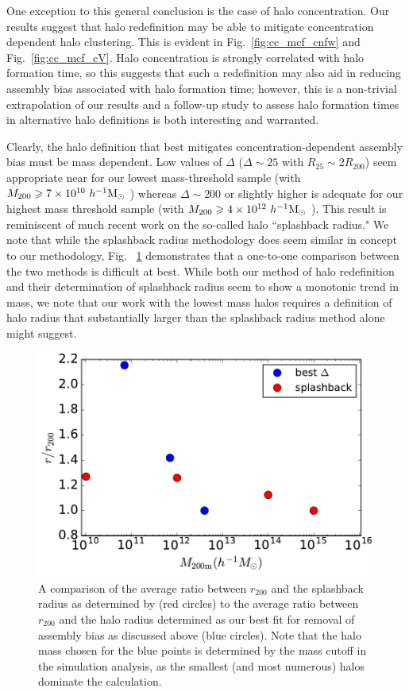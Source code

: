 \documentclass[usenatbib]{mnras}
\begin{document}
One exception to this general conclusion is the case of halo concentration. 
Our results suggest that halo redefinition may be able to mitigate concentration 
dependent halo clustering. This is evident in Fig.~\ref{fig:cc_mcf_cnfw} and 
Fig.~\ref{fig:cc_mcf_cV}. Halo concentration is strongly correlated with halo formation 
time, so this suggests that such a redefinition may also aid in reducing assembly bias 
associated with halo formation time; however, this is a non-trivial extrapolation of our 
results and a follow-up study to assess halo formation times in alternative halo definitions 
is both interesting and warranted. 

Clearly, the halo definition that best mitigates 
concentration-dependent assembly bias must be mass dependent. Low 
values of $\Delta$ ($\Delta \sim 25$ with $R_{25} \sim 2R_{200}$) seem appropriate near for our lowest 
mass-threshold sample (with $M_{200} \geqslant 7 \times 10^{10} \ h^{-1}\mathrm{M}_{\odot}~$) whereas $\Delta \sim 200$ or slightly higher
is adequate for our highest mass threshold sample (with $M_{200} \geqslant 4 \times 10^{12} \ h^{-1}\mathrm{M}_{\odot}~$). This result is
reminiscent of much recent work on the so-called halo ``splashback radius."\citep{more_etal15} We note that while
the splashback radius methodology does seem similar in concept to our methodology, 
Fig. ~\ref{fig:splashback_compare} demonstrates that a one-to-one comparison between the two methods is difficult
at best. While both our method of halo redefinition and their determination of splashback radius seem to show a
monotonic trend in mass, we note that our work with the lowest mass halos requires a definition of halo radius
that substantially larger than the splashback radius method alone might suggest.

\begin{figure}
	\centering
	\includegraphics[width=.4\textwidth]{test_splashback.pdf}
	\caption{A comparison of the average ratio between $r_{200}$ and the splashback radius as determined by
	 \citet{more_etal15} (red circles) to the average ratio between $r_{200}$ and the halo radius determined as our
	  best fit for removal of assembly bias as discussed above (blue circles). Note that the halo mass chosen for
	  the blue points is determined by the mass cutoff in the simulation analysis, as the smallest (and most
	  numerous) halos dominate the calculation.}
	\label{fig:splashback_compare}
\end{figure}
\end{document}
